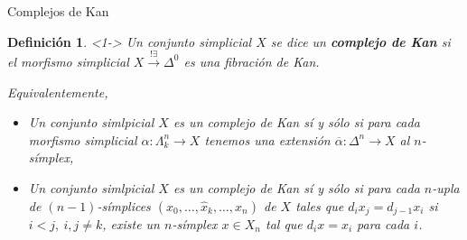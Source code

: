 \documentclass[11pt]{beamer}
\renewcommand{\ss}[1]{\Delta^{#1}}
\newcommand{\horn}[2]{\Lambda^{#1}_{#2}}
\newtheorem{defs}{Definición}
\begin{document}
\begin{frame}{Complejos de Kan}
\begin{defs} <1-> Un conjunto simplicial $X$ se dice un \textbf{complejo de Kan} si el morfismo simplicial $X \xrightarrow{!\exists} \ss{0}$ es una fibración de Kan.

Equivalentemente, 
\begin{itemize}
\item <2-> Un conjunto simlpicial $X$ es un complejo de Kan sí y sólo si para cada morfismo simplicial $\alpha : \horn{n}{k} \to X$ tenemos una extensión $\overline{\alpha} : \ss{n} \to X$ al $n$-símplex,
\begin{center}
\end{center}
\item <3-> Un conjunto simlpicial $X$ es un complejo de Kan sí y sólo si para cada $n$-upla de $(n-1)$-símplices $(x_0,\dots,\widehat{x}_k,\dots, x_n)$ de $X$ tales que $d_ix_j = d_{j-1}x_i$ si $i < j, \ i,j \neq k$, existe un $n$-símplex $x \in X_n$ tal que $d_ix = x_i$ para cada $i$.
\end{itemize}
\end{defs}
\end{frame}
\end{document}
